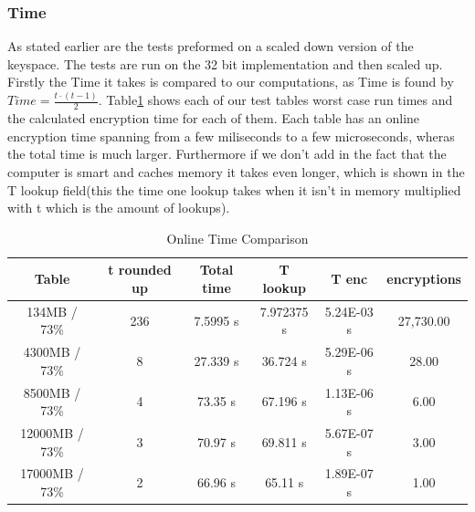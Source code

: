 \subsubsection{Time}
As stated earlier are the tests preformed on a scaled down version of the keyspace.
The tests are run on the 32 bit implementation and then scaled up.
Firstly the Time it takes is compared to our computations, as Time is found by $Time=\frac{t\cdot(t-1)}{2}$.
Table\ref{tab:OnlineT} shows each of our test tables worst case run times and the calculated encryption time for each of them.
Each  table has an online encryption time spanning from a few miliseconds to a few microseconds, wheras the total time is  much larger.
Furthermore if we don't add in the fact that the computer is smart and caches memory it takes even longer, which is shown in the T lookup field(this the time one lookup takes when it isn't in memory multiplied with t which is the amount of lookups).
\begin{table}[H]
\centering
\caption{Online Time Comparison}
\label{tab:OnlineT}
\begin{tabular}{|c|ccccc}
\hline
Table          & \multicolumn{1}{c|}{t rounded up} & \multicolumn{1}{c|}{Total time} & \multicolumn{1}{c|}{T lookup} & \multicolumn{1}{c|}{T enc} & \multicolumn{1}{c|}{encryptions} \\ \hline
134MB / 73\%   & 236                           & 7.5995 s                        & 7.972375 s                    & 5.24E-03 s                 & 27,730.00                        \\ \cline{1-1}
4300MB / 73\%  & 8                             & 27.339 s                        & 36.724 s                      & 5.29E-06 s                 & 28.00                            \\ \cline{1-1}
8500MB / 73\%  & 4                             & 73.35 s                         & 67.196 s                      & 1.13E-06 s                 & 6.00                             \\ \cline{1-1}
12000MB / 73\% & 3                             & 70.97 s                         & 69.811 s                      & 5.67E-07 s                 & 3.00                             \\ \cline{1-1}
17000MB / 73\%  & 2                             & 66.96 s                         & 65.11 s                       & 1.89E-07 s                 & 1.00                             \\ \cline{1-1}
\end{tabular}
\end{table}

